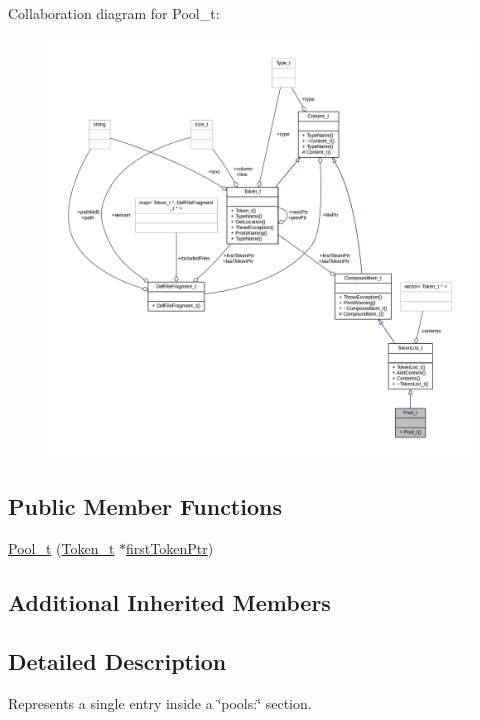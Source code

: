 Collaboration diagram for Pool\+\_\+t\+:
\nopagebreak
\begin{figure}[H]
\begin{center}
\leavevmode
\includegraphics[width=350pt]{struct_pool__t__coll__graph}
\end{center}
\end{figure}
\subsection*{Public Member Functions}
\begin{DoxyCompactItemize}
\item 
\hyperlink{struct_pool__t_ae9f783e8a8c3f81d72a49d80cd1dd631}{Pool\+\_\+t} (\hyperlink{struct_token__t}{Token\+\_\+t} $\ast$\hyperlink{struct_compound_item__t_a4d95dc788120f627e332491589d20c5c}{first\+Token\+Ptr})
\end{DoxyCompactItemize}
\subsection*{Additional Inherited Members}


\subsection{Detailed Description}
Represents a single entry inside a \char`\"{}pools\+:\char`\"{} section. 

